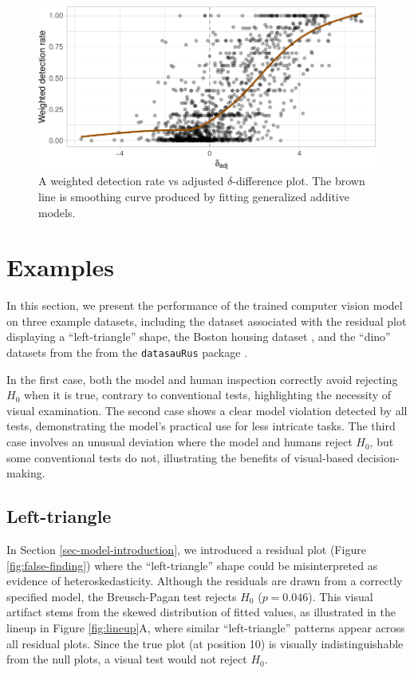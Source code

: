 \documentclass[]{interact}
\theoremstyle{plain}%
\theoremstyle{definition}
\theoremstyle{remark}
\begin{document}
\begin{figure}[!h]

{\centering \includegraphics[width=0.8\linewidth]{paper_files/figure-latex/delta-1} 

}

\caption{A weighted detection rate vs adjusted $\delta$-difference plot. The brown line is smoothing curve produced by fitting generalized additive models.}\label{fig:delta}
\end{figure}

\section{Examples}\label{sec-examples}

In this section, we present the performance of the trained computer
vision model on three example datasets, including the dataset associated
with the residual plot displaying a ``left-triangle'' shape, the Boston
housing dataset \citep{harrison1978hedonic}, and the ``dino'' datasets
from the from the \texttt{datasauRus} package \citep{datasaurus}.

In the first case, both the model and human inspection correctly avoid
rejecting \(H_0\) when it is true, contrary to conventional tests,
highlighting the necessity of visual examination. The second case shows
a clear model violation detected by all tests, demonstrating the model's
practical use for less intricate tasks. The third case involves an
unusual deviation where the model and humans reject \(H_0\), but some
conventional tests do not, illustrating the benefits of visual-based
decision-making.

\subsection{Left-triangle}\label{left-triangle}

In Section \ref{sec-model-introduction}, we introduced a residual plot
(Figure \ref{fig:false-finding}) where the ``left-triangle'' shape could
be misinterpreted as evidence of heteroskedasticity. Although the
residuals are drawn from a correctly specified model, the Breusch-Pagan
test rejects \(H_0\) (\(p = 0.046\)). This visual artifact stems from
the skewed distribution of fitted values, as illustrated in the lineup
in Figure \ref{fig:lineup}A, where similar ``left-triangle'' patterns
appear across all residual plots. Since the true plot (at position 10)
is visually indistinguishable from the null plots, a visual test would
not reject \(H_0\).
\end{document}
